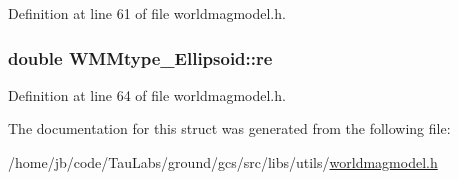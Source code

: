 \-Definition at line 61 of file worldmagmodel.\-h.

\hypertarget{struct_w_m_mtype___ellipsoid_aa051b086d02950addfe843925a79b3f9}{
\subsubsection[{re}]{\setlength{\rightskip}{0pt plus 5cm}double {\bf \-W\-M\-Mtype\-\_\-\-Ellipsoid\-::re}}}\label{struct_w_m_mtype___ellipsoid_aa051b086d02950addfe843925a79b3f9}


\-Definition at line 64 of file worldmagmodel.\-h.



\-The documentation for this struct was generated from the following file\-:\begin{DoxyCompactItemize}
\item 
/home/jb/code/\-Tau\-Labs/ground/gcs/src/libs/utils/\hyperlink{worldmagmodel_8h}{worldmagmodel.\-h}\end{DoxyCompactItemize}
